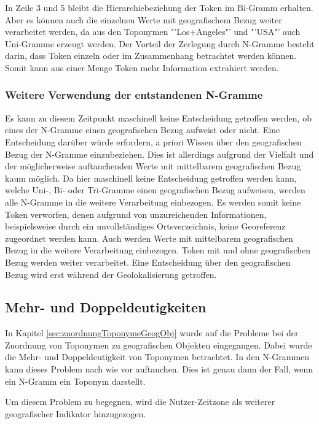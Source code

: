 				In Zeile 3 und 5 bleibt die Hierarchiebeziehung der Token im Bi-Gramm erhalten.
				Aber es können auch die einzelnen Werte mit geografischem Bezug weiter verarbeitet werden, da aus den Toponymen "'Los+Angeles"' und "'USA"' auch Uni-Gramme erzeugt werden.
				Der Vorteil der Zerlegung durch N-Gramme besteht darin, dass Token einzeln oder im Zusammenhang betrachtet werden können. 
				Somit kann aus einer Menge Token mehr Information extrahiert werden.

			\subsubsection{Weitere Verwendung der entstandenen N-Gramme} 

				Es kann zu diesem Zeitpunkt maschinell keine Entscheidung getroffen werden, ob eines der N-Gramme einen geografischen Bezug aufweist oder nicht.
				Eine Entscheidung darüber würde erfordern, a priori Wissen über den geografischen Bezug der N-Gramme einzubeziehen. 
				Dies ist allerdings aufgrund der Vielfalt und der möglicherweise auftauchenden Werte mit mittelbarem geografischen Bezug kaum möglich. 
				Da hier maschinell keine Entscheidung getroffen werden kann, welche Uni-, Bi- oder Tri-Gramme einen geografischen Bezug aufweisen, werden alle N-Gramme in die weitere Verarbeitung einbezogen. 			
				Es werden somit keine Token verworfen, denen aufgrund von unzureichenden Informationen, beispielsweise durch ein unvollständiges Ortsverzeichnis, keine Georeferenz zugeordnet werden kann.
				Auch werden Werte mit mittelbarem geografischen Bezug in die weitere Verarbeitung einbezogen.
				Token mit und ohne geografischen Bezug werden weiter verarbeitet.
				Eine Entscheidung über den geografischen Bezug wird erst während der Geolokalisierung getroffen.

		\subsection{Mehr- und Doppeldeutigkeiten} \label{sub:VorvNutzerZeitzone} 

				In Kapitel \ref{sec:zuordnungToponymeGeogObj} wurde auf die Probleme bei der Zuordnung von Toponymen zu geografischen Objekten eingegangen.
				Dabei wurde die Mehr- und Doppeldeutigkeit von Toponymen betrachtet.
				In den N-Grammen kann dieses Problem nach wie vor auftauchen.
				Dies ist genau dann der Fall, wenn ein N-Gramm ein Toponym darstellt.

				Um diesem Problem zu begegnen, wird die Nutzer-Zeitzone als weiterer geografischer Indikator hinzugezogen.

